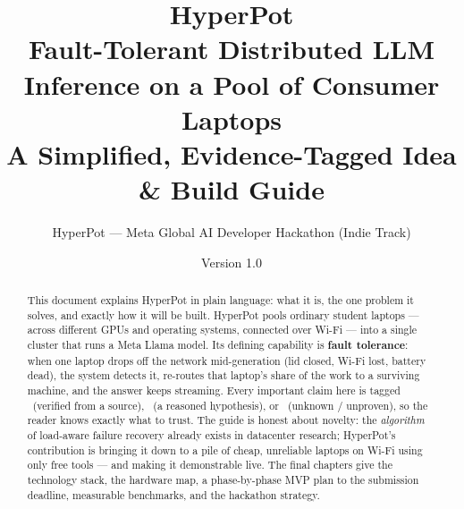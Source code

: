\documentclass[11pt]{article}
\title{\vspace{-1.5em}\textbf{HyperPot}\\[0.2em]
\large Fault-Tolerant Distributed LLM Inference on a Pool of Consumer Laptops\\[0.3em]
\normalsize A Simplified, Evidence-Tagged Idea \& Build Guide}
\author{\normalsize HyperPot --- Meta Global AI Developer Hackathon (Indie Track)}
\date{\normalsize Version 1.0}
\begin{document}
\maketitle
\thispagestyle{fancy}

\begin{abstract}
\noindent This document explains HyperPot in plain language: what it is, the one
problem it solves, and exactly how it will be built. HyperPot pools ordinary
student laptops --- across different GPUs and operating systems, connected over
Wi-Fi --- into a single cluster that runs a Meta Llama model. Its defining
capability is \textbf{fault tolerance}: when one laptop drops off the network
mid-generation (lid closed, Wi-Fi lost, battery dead), the system detects it,
re-routes that laptop's share of the work to a surviving machine, and the answer
keeps streaming. Every important claim here is tagged \VER\ (verified from a
source), \HYP\ (a reasoned hypothesis), or \UNK\ (unknown / unproven), so the
reader knows exactly what to trust. The guide is honest about novelty: the
\emph{algorithm} of load-aware failure recovery already exists in datacenter
research; HyperPot's contribution is bringing it down to a pile of cheap,
unreliable laptops on Wi-Fi using only free tools --- and making it demonstrable
live. The final chapters give the technology stack, the hardware map, a
phase-by-phase MVP plan to the submission deadline, measurable benchmarks, and
the hackathon strategy.
\end{abstract}

\tableofcontents
\clearpage














\end{document}
